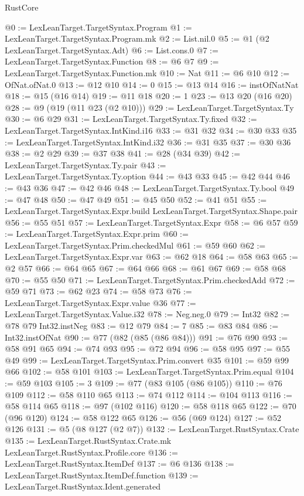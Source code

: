 \begin{lexlean}{RustCore}
\begin{coremodule}
{\begin{coremodule}
{{{{{@0 := LexLeanTarget.TargetSyntax.Program
@1 := LexLeanTarget.TargetSyntax.Program.mk
@2 := List.nil.{0}
@5 := @1 (@2 LexLeanTarget.TargetSyntax.Adt)
@6 := List.cons.{0}
@7 := LexLeanTarget.TargetSyntax.Function
@8 := @6 @7
@9 := LexLeanTarget.TargetSyntax.Function.mk
@10 := Nat
@11 := @6 @10
@12 := OfNat.ofNat.{0}
@13 := @12 @10
@14 := 0
@15 := @13 @14
@16 := instOfNatNat
@18 := @15 (@16 @14)
@19 := @11 @18
@20 := 1
@23 := @13 @20 (@16 @20)
@28 := @9 (@19 (@11 @23 (@2 @10)))
@29 := LexLeanTarget.TargetSyntax.Ty
@30 := @6 @29
@31 := LexLeanTarget.TargetSyntax.Ty.fixed
@32 := LexLeanTarget.TargetSyntax.IntKind.i16
@33 := @31 @32
@34 := @30 @33
@35 := LexLeanTarget.TargetSyntax.IntKind.i32
@36 := @31 @35
@37 := @30 @36
@38 := @2 @29
@39 := @37 @38
@41 := @28 (@34 @39)
@42 := LexLeanTarget.TargetSyntax.Ty.pair
@43 := LexLeanTarget.TargetSyntax.Ty.option
@44 := @43 @33
@45 := @42 @44
@46 := @43 @36
@47 := @42 @46
@48 := LexLeanTarget.TargetSyntax.Ty.bool
@49 := @47 @48
@50 := @47 @49
@51 := @45 @50
@52 := @41 @51
@55 := LexLeanTarget.TargetSyntax.Expr.build LexLeanTarget.TargetSyntax.Shape.pair
@56 := @55 @51
@57 := LexLeanTarget.TargetSyntax.Expr
@58 := @6 @57
@59 := LexLeanTarget.TargetSyntax.Expr.prim
@60 := LexLeanTarget.TargetSyntax.Prim.checkedMul
@61 := @59 @60
@62 := LexLeanTarget.TargetSyntax.Expr.var
@63 := @62 @18
@64 := @58 @63
@65 := @2 @57
@66 := @64 @65
@67 := @64 @66
@68 := @61 @67
@69 := @58 @68
@70 := @55 @50
@71 := LexLeanTarget.TargetSyntax.Prim.checkedAdd
@72 := @59 @71
@73 := @62 @23
@74 := @58 @73
@76 := LexLeanTarget.TargetSyntax.Expr.value @36
@77 := LexLeanTarget.TargetSyntax.Value.i32
@78 := Neg.neg.{0}
@79 := Int32
@82 := @78 @79 Int32.instNeg
@83 := @12 @79
@84 := 7
@85 := @83 @84
@86 := Int32.instOfNat
@90 := @77 (@82 (@85 (@86 @84)))
@91 := @76 @90
@93 := @58 @91 @65
@94 := @74 @93
@95 := @72 @94
@96 := @58 @95
@97 := @55 @49
@99 := LexLeanTarget.TargetSyntax.Prim.convert @35
@101 := @59 @99 @66
@102 := @58 @101
@103 := LexLeanTarget.TargetSyntax.Prim.equal
@104 := @59 @103
@105 := 3
@109 := @77 (@83 @105 (@86 @105))
@110 := @76 @109
@112 := @58 @110 @65
@113 := @74 @112
@114 := @104 @113
@116 := @58 @114 @65
@118 := @97 (@102 @116)
@120 := @58 @118 @65
@122 := @70 (@96 @120)
@124 := @58 @122 @65
@126 := @56 (@69 @124)
@127 := @52 @126
@131 := @5 (@8 @127 (@2 @7))
@132 := LexLeanTarget.RustSyntax.Crate
@135 := LexLeanTarget.RustSyntax.Crate.mk LexLeanTarget.RustSyntax.Profile.core
@136 := LexLeanTarget.RustSyntax.ItemDef
@137 := @6 @136
@138 := LexLeanTarget.RustSyntax.ItemDef.function
@139 := LexLeanTarget.RustSyntax.Ident.generated
}}}}}
\end{coremodule}}
\end{coremodule}
\end{lexlean}
